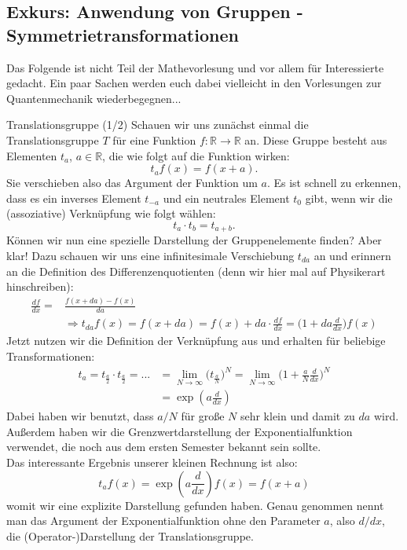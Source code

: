 \subsection{Exkurs: Anwendung von Gruppen - Symmetrietransformationen}\label{ssec:ExkursSymTrafos}
Das Folgende ist nicht Teil der Mathevorlesung und vor allem für Interessierte gedacht. Ein paar Sachen werden euch dabei vielleicht in den Vorlesungen zur Quantenmechanik wiederbegegnen... \\
\begin{Beispiel}{Translationsgruppe (1/2)}
Schauen wir uns zunächst einmal die Translationsgruppe $T$ für eine Funktion \linebreak $f:\mathbb{R} \rightarrow \mathbb{R}$ an. Diese Gruppe besteht aus Elementen $t_{a}$, $a \in \mathbb{R}$, die wie folgt auf die Funktion wirken:
\begin{equation*}
    t_{a}f(x)=f(x+a).    
\end{equation*}
Sie verschieben also das Argument der Funktion um $a$. Es ist schnell zu erkennen, dass es ein inverses Element $t_{-a}$ und ein neutrales Element $t_{0}$ gibt, wenn wir die (assoziative) Verknüpfung wie folgt wählen:
\begin{equation*}
    t_{a}\cdot t_{b} = t_{a+b}.
\end{equation*}
Können wir nun eine spezielle Darstellung der Gruppenelemente finden? Aber klar! Dazu schauen wir uns eine infinitesimale Verschiebung $t_{da}$ an und erinnern an die Definition des Differenzenquotienten (denn wir hier mal auf Physikerart hinschreiben):
\begin{align*}
    \frac{df}{dx}=&\frac{f(x+da)-f(x)}{da} \\
    &\Rightarrow t_{da}f(x) = f(x+da) = f(x)+da \cdot \frac{df}{dx} = \big( 1 + da\frac{d}{dx} \big) f(x)
\end{align*}
Jetzt nutzen wir die Definition der Verknüpfung aus und erhalten für beliebige Transformationen:
\begin{align*}
    t_{a} = t_{\frac{a}{2}}\cdot t_{\frac{a}{2}} = ... &= \lim_{N \rightarrow \infty} \big( t_{\frac{a}{N}} \big)^{N} = \lim_{N \rightarrow \infty} \big( 1 + \frac{a}{N} \frac{d}{dx} \big)^{N} \\ 
    &= \exp{(a\frac{d}{dx})}
\end{align*}
Dabei haben wir benutzt, dass $a/N$ für große $N$ sehr klein und damit zu $da$ wird. Außerdem haben wir die Grenzwertdarstellung der Exponentialfunktion verwendet, die noch aus dem ersten Semester bekannt sein sollte. \\
Das interessante Ergebnis unserer kleinen Rechnung ist also:
\begin{equation*}
    t_{a}f(x)=\exp{(a\frac{d}{dx})}f(x) = f(x+a)
\end{equation*}
womit wir eine explizite Darstellung gefunden haben. Genau genommen nennt man das Argument der Exponentialfunktion ohne den Parameter $a$, also $d/dx$, die (Operator-)Darstellung der Translationsgruppe.
\end{Beispiel}

